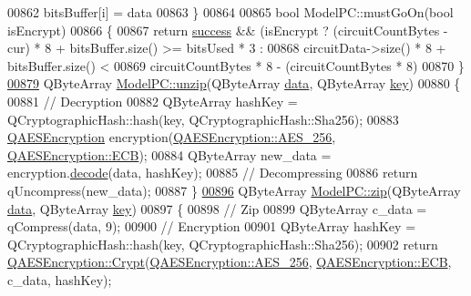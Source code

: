 \begin{DoxyCode}
{00862         bitsBuffer[i] = data %
00863 \}
00864 
00865 \textcolor{keywordtype}{bool} ModelPC::mustGoOn(\textcolor{keywordtype}{bool} isEncrypt)
00866 \{
00867     \textcolor{keywordflow}{return} \hyperlink{class_model_p_c_a945ffbbc44a832b953c191debd448f4c}{success} && (isEncrypt ? (circuitCountBytes - cur) * 8 + bitsBuffer.size() >= bitsUsed * 3
       :
00868                                    circuitData->size() * 8 + bitsBuffer.size() <
00869                                    circuitCountBytes * 8 - (circuitCountBytes * 8)%
00870 \}
\hypertarget{modelpc_8cpp_source.tex_l00879}{}\hyperlink{class_model_p_c_a6da88f166785a49f73b22c169f956fd0}{00879} QByteArray \hyperlink{class_model_p_c_a6da88f166785a49f73b22c169f956fd0}{ModelPC::unzip}(QByteArray \hyperlink{namespace_errors_dict_setup_af570460846fb9f0c91abd308a095dcdc}{data}, QByteArray \hyperlink{namespace_errors_dict_setup_a09c268098d09ffb8e5504f30fa6d5dd9}{key})
00880 \{
00881     \textcolor{comment}{// Decryption}
00882     QByteArray hashKey = QCryptographicHash::hash(key, QCryptographicHash::Sha256);
00883     \hyperlink{class_q_a_e_s_encryption}{QAESEncryption} encryption(\hyperlink{class_q_a_e_s_encryption_abe48208f4f6c7d68e6a10b49b9d0b7bdacde97774ab1d4c609e04b0dd13a1e1f7}{QAESEncryption::AES\_256}, 
      \hyperlink{class_q_a_e_s_encryption_ad3e031c49a3d56566379d75b40b7b255a4ca7f51778e2adf1f464164a0ba8e75e}{QAESEncryption::ECB});
00884     QByteArray new\_data = encryption.\hyperlink{class_q_a_e_s_encryption_a58f972f2b66c2454edd5112495463bba}{decode}(data, hashKey);
00885     \textcolor{comment}{// Decompressing}
00886     \textcolor{keywordflow}{return} qUncompress(new\_data);
00887 \}
\hypertarget{modelpc_8cpp_source.tex_l00896}{}\hyperlink{class_model_p_c_afebbbfa4b07deba4f68fc6dfb50f353f}{00896} QByteArray \hyperlink{class_model_p_c_afebbbfa4b07deba4f68fc6dfb50f353f}{ModelPC::zip}(QByteArray \hyperlink{namespace_errors_dict_setup_af570460846fb9f0c91abd308a095dcdc}{data}, QByteArray \hyperlink{namespace_errors_dict_setup_a09c268098d09ffb8e5504f30fa6d5dd9}{key})
00897 \{
00898     \textcolor{comment}{// Zip}
00899     QByteArray c\_data = qCompress(data, 9);
00900     \textcolor{comment}{// Encryption}
00901     QByteArray hashKey = QCryptographicHash::hash(key, QCryptographicHash::Sha256);
00902     \textcolor{keywordflow}{return} \hyperlink{class_q_a_e_s_encryption_a43819eeb6a7cb29fbd3cb6ad640dcbdf}{QAESEncryption::Crypt}(\hyperlink{class_q_a_e_s_encryption_abe48208f4f6c7d68e6a10b49b9d0b7bdacde97774ab1d4c609e04b0dd13a1e1f7}{QAESEncryption::AES\_256}, 
      \hyperlink{class_q_a_e_s_encryption_ad3e031c49a3d56566379d75b40b7b255a4ca7f51778e2adf1f464164a0ba8e75e}{QAESEncryption::ECB}, c\_data, hashKey);
}
\end{DoxyCode}

